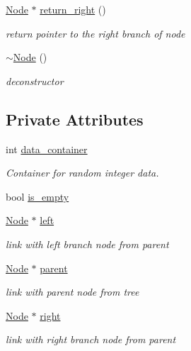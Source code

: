 \begin{DoxyCompactItemize}
\hyperlink{class_node}{Node} $\ast$ \hyperlink{class_node_a2789b35639dd329c7f406a5908ec386a}{return\+\_\+right} ()
\begin{DoxyCompactList}\small\item\em return pointer to the right branch of node \end{DoxyCompactList}\item 
\hyperlink{class_node_aa0840c3cb5c7159be6d992adecd2097c}{$\sim$\+Node} ()
\begin{DoxyCompactList}\small\item\em deconstructor \end{DoxyCompactList}\end{DoxyCompactItemize}
\subsection*{Private Attributes}
\begin{DoxyCompactItemize}
\item 
int \hyperlink{class_node_ab10f24c6461961ed57ca11e942fc8c3e}{data\+\_\+container}
\begin{DoxyCompactList}\small\item\em Container for random integer data. \end{DoxyCompactList}\item 
bool \hyperlink{class_node_a03859657e8fb6e70be22fa53cb848241}{is\+\_\+empty}
\item 
\hyperlink{class_node}{Node} $\ast$ \hyperlink{class_node_a05ef70dd2b0b89db38cda977021ee696}{left}
\begin{DoxyCompactList}\small\item\em link with left branch node from parent \end{DoxyCompactList}\item 
\hyperlink{class_node}{Node} $\ast$ \hyperlink{class_node_a2149dcf83c930a3c0b388f51dbb42410}{parent}
\begin{DoxyCompactList}\small\item\em link with parent node from tree \end{DoxyCompactList}\item 
\hyperlink{class_node}{Node} $\ast$ \hyperlink{class_node_a45c7b7ddeefcffe349a1f13ec586107c}{right}
\begin{DoxyCompactList}\small\item\em link with right branch node from parent \end{DoxyCompactList}\end{DoxyCompactItemize}



